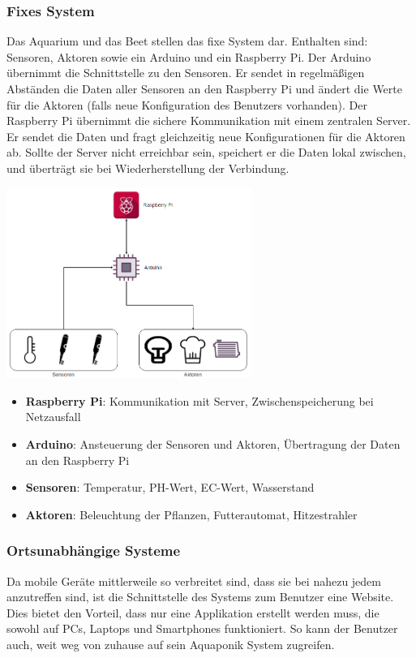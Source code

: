 \documentclass[11pt]{article}
\begin{document}
\subsubsection{Fixes System}
Das Aquarium und das Beet stellen das fixe System dar. Enthalten sind: Sensoren, Aktoren sowie ein Arduino und ein Raspberry Pi. Der Arduino \"ubernimmt die Schnittstelle zu den Sensoren. Er sendet in regelm\"aßigen Abst\"anden die Daten aller Sensoren an den Raspberry Pi und \"andert die Werte f\"ur die Aktoren (falls neue Konfiguration des Benutzers vorhanden). Der Raspberry Pi \"ubernimmt die sichere Kommunikation mit einem zentralen Server. Er sendet die Daten und fragt gleichzeitig neue Konfigurationen f\"ur die Aktoren ab. Sollte der Server nicht erreichbar sein, speichert er die Daten lokal zwischen, und \"ubertr\"agt sie bei Wiederherstellung der Verbindung.
\begin{center}
	\includegraphics[width=8cm]{fixesSystem}
\end{center}
\vskip1cm
\begin{itemize}
	\item \textbf{Raspberry Pi}: Kommunikation mit Server, Zwischenspeicherung bei Netzausfall
	\item \textbf{Arduino}: Ansteuerung der Sensoren und Aktoren, \"Ubertragung der Daten an den Raspberry Pi
	\item \textbf{Sensoren}: Temperatur, PH-Wert, EC-Wert, Wasserstand
	\item \textbf{Aktoren}: Beleuchtung der Pflanzen, Futterautomat, Hitzestrahler
\end{itemize}
\subsubsection{Ortsunabh\"angige Systeme}
Da mobile Ger\"ate mittlerweile so verbreitet sind, dass sie bei nahezu jedem anzutreffen sind, ist die Schnittstelle des Systems zum Benutzer eine Website. Dies bietet den Vorteil, dass nur eine Applikation erstellt werden muss, die sowohl auf PCs, Laptops und Smartphones funktioniert. So kann der Benutzer auch, weit weg von zuhause auf sein Aquaponik System zugreifen.
\end{document}
